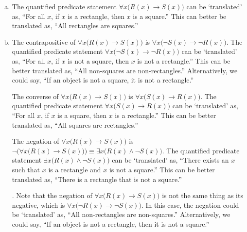 \documentclass[11pt,letterpaper]{article}
\begin{document}
\sol 
\begin{enumerate}[(a)]
\item The quantified predicate statement $\forall x \big( R(x) \to S(x) \big)$ can be `translated' as, ``For all $x$, if $x$ is a rectangle, then $x$ is a square.'' This can better be translated as, ``All rectangles are squares.'' \pspace

\item The contrapositive of $\forall x \big( R(x) \to S(x) \big)$ is $\forall x \big( \neg S(x) \to \neg R(x) \big)$. The quantified predicate statement $\forall x \big( \neg S(x) \to \neg R(x) \big)$ can be `translated' as, ``For all $x$, if $x$ is not a square, then $x$ is not a rectangle.'' This can be better translated as, ``All non-squares are non-rectangles.'' Alternatively, we could say, ``If an object is not a square, it is not a rectangle.'' \pspace

The converse of $\forall x \big( R(x) \to S(x) \big)$ is $\forall x \big( S(x) \to R(x) \big)$. The quantified predicate statement $\forall x \big( S(x) \to R(x) \big)$ can be `translated' as, ``For all $x$, if $x$ is a square, then $x$ is a rectangle.'' This can be better translated as, ``All squares are rectangles.'' \pspace

The negation of $\forall x \big( R(x) \to S(x) \big)$ is $\neg \bigg( \forall x \big( R(x) \to S(x) \big) \bigg) \equiv \exists x \big( R(x) \wedge \neg S(x) \big)$. The quantified predicate statement $\exists x \big( R(x) \wedge \neg S(x) \big)$ can be `translated' as, ``There exists an $x$ such that $x$ is a rectangle and $x$ is not a square.'' This can be better translated as, ``There is a rectangle that is not a square.'' \pspace

. Note that the negation of $\forall x \big( R(x) \to S(x) \big)$ is not the same thing as its negative, which is $\forall x \big( \neg R(x) \to \neg S(x) \big)$. In this case, the negation could be `translated' as, ``All non-rectangles are non-squares.'' Alternatively, we could say, ``If an object is not a rectangle, then it is not a square.''
\end{enumerate}
\end{document}
